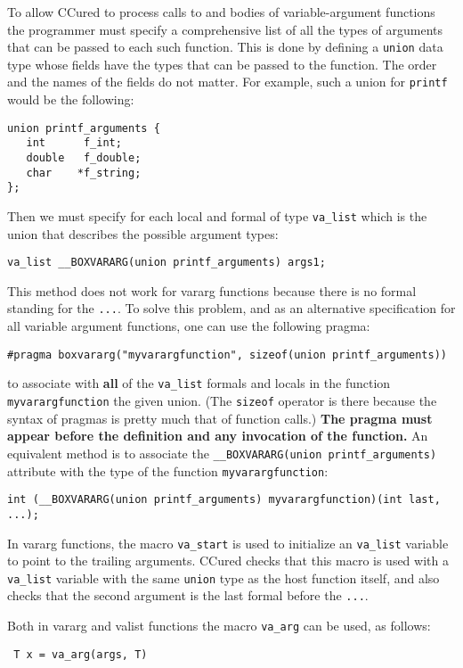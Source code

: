 \documentclass{book}
\def\t#1{{\tt #1}}
\begin{document}
 To allow CCured to process calls to and bodies of variable-argument functions
the programmer must specify a comprehensive list of all the types of arguments
that can be passed to each such function. This is done by defining a \t{union}
data type whose fields have the types that can be passed to the function. The
order and the names of the fields do not matter. For example, such a union for
\t{printf} would be the following:
\begin{verbatim}
union printf_arguments {
   int      f_int;
   double   f_double;
   char    *f_string;
};
\end{verbatim}

 Then we must specify for each local and formal of type \t{va\_list} which is
the union that describes the possible argument types: 
\begin{verbatim}
va_list __BOXVARARG(union printf_arguments) args1;
\end{verbatim}

 This method does not work for vararg functions because there is no formal
standing for the \t{...}. To solve this problem, and as an alternative
specification for all variable argument functions, one can use the following
pragma:
\begin{verbatim}
#pragma boxvararg("myvarargfunction", sizeof(union printf_arguments))
\end{verbatim}

 to associate with {\bf all} of the \t{va\_list} formals and locals in the
function \t{myvarargfunction} the given union. (The \t{sizeof} operator is
there because the syntax of pragmas is pretty much that of function calls.)
{\bf The pragma must appear before the definition and any invocation of the
function.} An equivalent method is to associate the \t{\_\_BOXVARARG(union
printf\_arguments)} attribute with the type of the function
\t{myvarargfunction}:
\begin{verbatim}
int (__BOXVARARG(union printf_arguments) myvarargfunction)(int last, ...);
\end{verbatim}

 In vararg functions, the macro \t{va\_start} is used to initialize an
\t{va\_list} variable to point to the trailing arguments. CCured checks that
this macro is used with a \t{va\_list} variable with the same \t{union} type
as the host function itself, and also checks that the second argument is the
last formal before the \t{...}. 

 Both in vararg and valist functions the macro \t{va\_arg} can be used, as
 follows: 
\begin{verbatim}
 T x = va_arg(args, T)
\end{verbatim}
\end{document}
